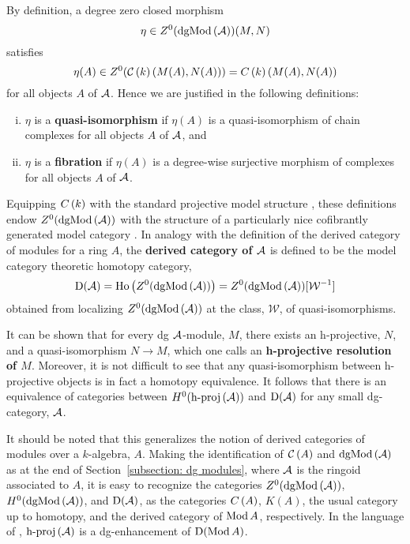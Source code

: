By definition, a degree zero closed morphism
\[\eta \in Z^0(\operatorname{dgMod}\left(\mathcal{A}\right))(M,N)\]
satisfies
\[\eta(A) \in Z^0(\mathcal{C}\left(k\right)(M(A), N(A))) = C\left(k\right)(M(A), N(A))\]
for all objects \(A\) of \(\mathcal{A}\).
Hence we are justified in the following definitions:
\begin{enumerate}[(i)]
\item
  \(\eta\) is a \textbf{quasi-isomorphism} if \(\eta(A)\) is a quasi-isomorphism of chain complexes for all objects \(A\) of \(\mathcal{A}\), and
\item
  \(\eta\) is a \textbf{fibration} if \(\eta(A)\) is a degree-wise surjective morphism of complexes for all objects \(A\) of \(\mathcal{A}\).
\end{enumerate}
Equipping \(C\left(k\right)\) with the standard projective model structure \parencite[Section 2.3]{Hovey99}, these definitions endow \(Z^0(\operatorname{dgMod}\left(\mathcal{A}\right))\) with the structure of a particularly nice cofibrantly generated model category \parencite[Section 3]{Toen07}.
In analogy with the definition of the derived category of modules for a ring \(A\), the \textbf{derived category of \(\mathcal{A}\)} is defined to be the model category theoretic homotopy category,
\[\mathrm{D}(\mathcal{A}) = \operatorname{Ho}\left(Z^0(\operatorname{dgMod}\left(\mathcal{A}\right))\right) = Z^0(\operatorname{dgMod}\left(\mathcal{A}\right))[\mathcal{W}^{-1}]\]
obtained from localizing \(Z^0(\operatorname{dgMod}\left(\mathcal{A}\right))\) at the class, \(\mathcal{W}\), of quasi-isomorphisms.

It can be shown \parencite[Section 3.5]{Keller95} that for every dg \(\mathcal{A}\)-module, \(M\), there exists an h-projective, \(N\), and a quasi-isomorphism \(N \to M\), which one calls an \textbf{h-projective resolution of \(M\)}.
Moreover, it is not difficult to see that any quasi-isomorphism between h-projective objects is in fact a homotopy equivalence.
It follows that there is an equivalence of categories between \(H^0(\operatorname{h-proj}\left(\mathcal{A}\right))\) and \(\mathrm{D}(\mathcal{A})\) for any small dg-category, \(\mathcal{A}\).

It should be noted that this generalizes the notion of derived categories of modules over a $k$-algebra, $A$.
Making the identification of $\mathcal{C}\left(A\right)$ and $\operatorname{dgMod}\left(\mathcal{A}\right)$ as at the end of Section~\ref{subsection: dg modules}, where $\mathcal{A}$ is the ringoid associated to $A$, it is easy to recognize the categories \(Z^0(\operatorname{dgMod}\left(\mathcal{A}\right))\), \(H^0(\operatorname{dgMod}\left(\mathcal{A}\right))\), and \(\mathrm{D}(\mathcal{A})\), as the categories \(C\left(A\right)\), \(K(A)\), the usual category up to homotopy, and the derived category of \(\operatorname{Mod}A\), respectively.
In the language of \textcite{Lunts-Orlov}, \(\operatorname{h-proj}\left(\mathcal{A}\right)\) is a dg-enhancement of \(\mathrm{D}(\operatorname{Mod}A)\).


